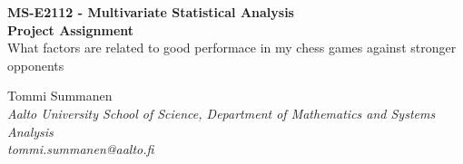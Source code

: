 \documentclass[12pt]{article}
\begin{document}

\begin{center}
    \Large{\bf MS-E2112 - Multivariate Statistical Analysis\\
    Project Assignment}\\
    \vspace{10pt}
    \large{What factors are related to good performace in my chess games against stronger opponents}
\end{center}
\vspace{10pt}
\begin{center}
    Tommi Summanen\\ 
    {\textit{{\small{
    Aalto University School of Science, Department of Mathematics and Systems Analysis\\
    tommi.summanen@aalto.fi}}}}
\end{center}










% 




\printbibliography
\end{document}

